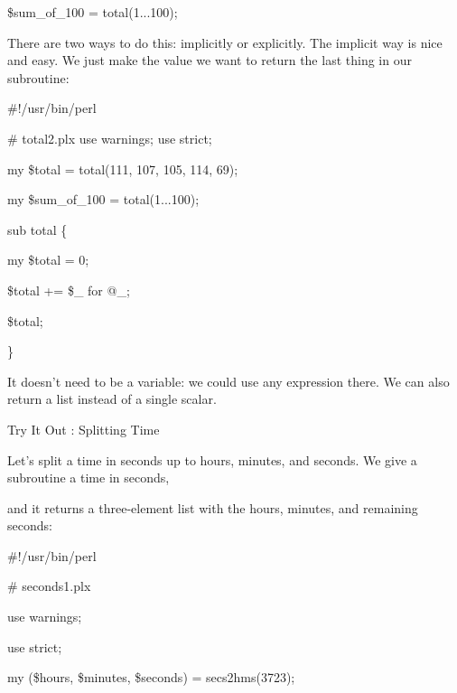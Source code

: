 \documentclass[a4paper,11pt]{book}
\begin{document}
\noindent 

\noindent \$sum\_of\_100 = total(1...100);

\noindent 

\noindent There are two ways to do this: implicitly or explicitly. The implicit way is nice and easy. We just make the value we want to return the last thing in our subroutine:

\noindent 

\noindent \#!/usr/bin/perl

\noindent \# total2.plx use warnings; use strict;

\noindent 

\noindent my \$total = total(111, 107, 105, 114, 69);

\noindent my \$sum\_of\_100 = total(1...100);

\noindent 

\noindent 

\noindent sub total \{

\noindent my \$total = 0;

\noindent \$total += \$\_  for @\_;

\noindent \$total;

\noindent \}

\noindent 

\noindent It doesn't need to be a variable: we could use any expression there. We can also return a list instead of a single scalar.

\noindent 

\noindent 

\noindent Try It Out : Splitting Time

\noindent 

\noindent 

\noindent Let's split a time in seconds up to hours, minutes, and seconds. We give a subroutine a time in seconds,

\noindent and it returns a three-element list with the hours, minutes, and remaining seconds:

\noindent 

\noindent 

\noindent \#!/usr/bin/perl

\noindent \# seconds1.plx

\noindent use warnings;

\noindent use strict;

\noindent 

\noindent my (\$hours, \$minutes, \$seconds) = secs2hms(3723);
\end{document}
